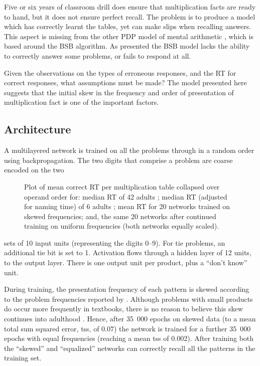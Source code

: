 Five or six years of classroom drill does ensure that multiplication facts
are ready to hand, but it does not ensure perfect recall. The problem is to
produce a model which has correctly learnt the tables, yet can make slips
when recalling answers. This aspect is missing from the other PDP model of
mental arithmetic \cite{andestud}, which is based around the BSB algorithm.
As presented the BSB model
lacks the ability to correctly answer some problems,
or fails to respond at all.

Given the observations on the types of erroneous responses, and the RT for
correct responses, what assumptions must be made? The model
presented here suggests that the initial skew in the frequency and order of
presentation of multiplication fact \cite[p.~118]{camprole} is
one of the important factors.

\subsection*{Architecture}

A multilayered network
is trained on all the problems  through  in a random
order using backpropagation. The two digits that comprise a problem are
coarse encoded on the two%
\begin{wrapfigure}[21]{r}{7.1cm}\fboxsep=2pt
\noindent{}
\caption{Plot of mean correct RT per multiplication table collapsed over
operand order for: median RT of 42 adults
\protect\cite[app.~D]{harlasso};
median RT (adjusted for naming time) of 6 adults
\protect\cite[table~A1]{millcogn};
mean RT for 20 networks trained on skewed frequencies; and, the same 20
networks after continued training on uniform frequencies (both networks
equally scaled).}
\label{rt01}\end{wrapfigure}
sets of 10 input units (representing the
digits 0--9).  For tie problems, an additional tie bit is set to 1.
Activation flows through a hidden layer of 12 units, to the output layer.
There is one output unit per product, plus a ``don't know'' unit.

During training, the presentation frequency of each pattern is skewed
according to the problem frequencies reported by . Although
problems with small products do occur more frequently in textbooks, there
is no reason to believe this skew continues into adulthood \cite[p.
328]{mcclmode}.  Hence, after 35~000 epochs on skewed data (to a mean total
sum squared error, tss, of 0.07) the network is trained for a further
35~000 epochs with equal frequencies (reaching a mean tss of 0.002).  After
training both the ``skewed'' and ``equalized'' networks can correctly
recall all the patterns in the training set.

